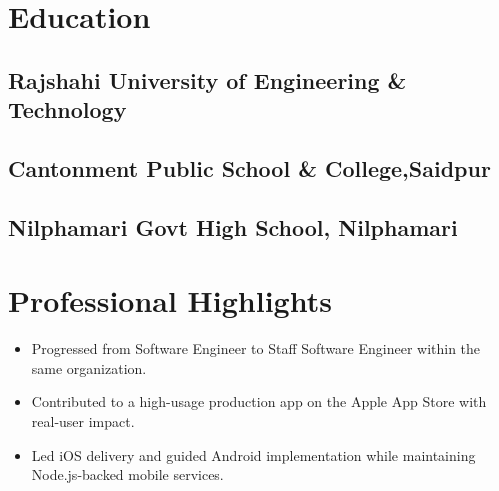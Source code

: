 \documentclass[]{plushcv}
\begin{document}
\begin{minipage}[t]{0.4\textwidth}
\section{Education}
\subsection{Rajshahi University of Engineering \& Technology}

\subsection{Cantonment Public School \& College,Saidpur}

\subsection{Nilphamari Govt High School, Nilphamari}

\section{Professional Highlights}
\begin{itemize}[leftmargin=*,noitemsep,topsep=2pt]
\item Progressed from Software Engineer to Staff Software Engineer within the same organization.
\item Contributed to a high-usage production app on the Apple App Store with real-user impact.
\item Led iOS delivery and guided Android implementation while maintaining Node.js-backed mobile services.
\end{itemize}

\end{minipage}

\newpage

\end{document}
